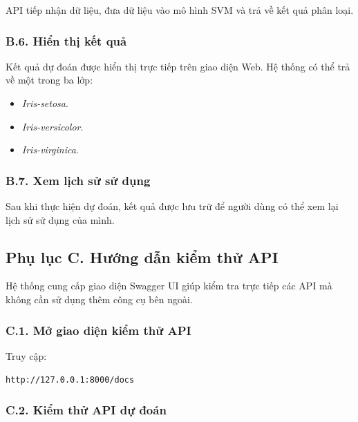 \documentclass[14pt]{extarticle}
\begin{document}
	\noindent
	API tiếp nhận dữ liệu, đưa dữ liệu vào mô hình SVM và trả về kết quả
	phân loại.
	
	\subsubsection*{B.6. Hiển thị kết quả}
	
	\noindent
	Kết quả dự đoán được hiển thị trực tiếp trên giao diện Web. Hệ thống
	có thể trả về một trong ba lớp:
	
	\begin{itemize}[leftmargin=*]
		\item \textit{Iris-setosa}.
		\item \textit{Iris-versicolor}.
		\item \textit{Iris-virginica}.
	\end{itemize}
	
	
	
	\subsubsection*{B.7. Xem lịch sử sử dụng}
	
	\noindent
	Sau khi thực hiện dự đoán, kết quả được lưu trữ để người dùng có thể
	xem lại lịch sử sử dụng của mình.
	

	
	
	
	\subsection*{Phụ lục C. Hướng dẫn kiểm thử API}
	
	\noindent
	Hệ thống cung cấp giao diện Swagger UI giúp kiểm tra trực tiếp các
	API mà không cần sử dụng thêm công cụ bên ngoài.
	
	\subsubsection*{C.1. Mở giao diện kiểm thử API}
	
	\noindent
	Truy cập:
	
	\begin{center}
		\texttt{http://127.0.0.1:8000/docs}
	\end{center}
	

	\subsubsection*{C.2. Kiểm thử API dự đoán}
	
\end{document}
